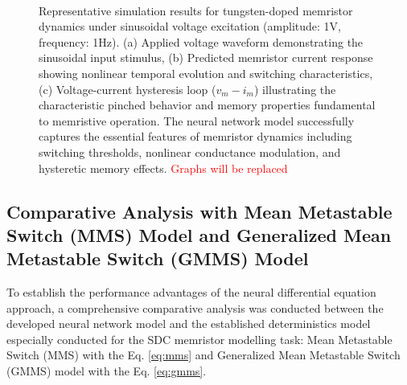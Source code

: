 \documentclass[lettersize,journal]{IEEEtran}
\newcommand{\TODO}[1]{\textcolor{red}{#1}}
\begin{document}
\begin{figure}[!t]
{  }
  \\
  \caption{Representative simulation results for tungsten-doped memristor dynamics under sinusoidal voltage excitation (amplitude: 1V, frequency: 1Hz). (a) Applied voltage waveform demonstrating the sinusoidal input stimulus, (b) Predicted memristor current response showing nonlinear temporal evolution and switching characteristics, (c) Voltage-current hysteresis loop (\(v_m - i_m\)) illustrating the characteristic pinched behavior and memory properties fundamental to memristive operation. The neural network model successfully captures the essential features of memristor dynamics including switching thresholds, nonlinear conductance modulation, and hysteretic memory effects. \TODO{Graphs will be replaced}}
  \label{fig:sample-results}
\end{figure}


\subsection{Comparative Analysis with Mean Metastable Switch (MMS) Model and Generalized Mean Metastable Switch (GMMS) Model}

\noindent
To establish the performance advantages of the neural differential equation approach, a comprehensive comparative analysis was conducted between the developed neural network model and the established deterministics model especially conducted for the SDC memristor modelling task: Mean Metastable Switch (MMS) with the Eq. \eqref{eq:mms} and Generalized Mean Metastable Switch (GMMS) model with the Eq. \eqref{eq:gmms}.
\end{document}
